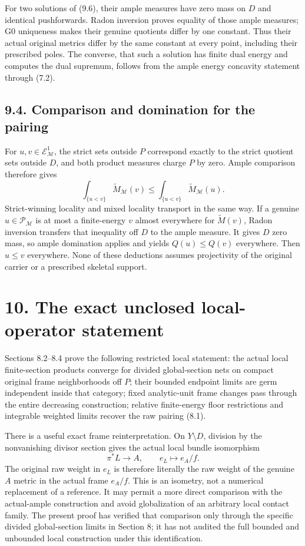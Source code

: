 \documentclass[
  10pt,
]{article}
\begin{document}
For two solutions of (9.6), their ample measures have zero mass on \(D\)
and identical pushforwards. Radon inversion proves equality of those
ample measures; G0 uniqueness makes their genuine quotients differ by
one constant. Thus their actual original metrics differ by the same
constant at every point, including their prescribed poles. The converse,
that such a solution has finite dual energy and computes the dual
supremum, follows from the ample energy concavity statement through
(7.2).

\subsection{9.4. Comparison and domination for the
pairing}\label{comparison-and-domination-for-the-pairing}

For \(u,v\in\mathcal E^1_{\mathcal M}\), the strict sets outside \(P\)
correspond exactly to the strict quotient sets outside \(D\), and both
product measures charge \(P\) by zero. Ample comparison therefore gives
\[\int_{\{u<v\}}\widetilde M_{\mathcal M}(v)
\leq\int_{\{u<v\}}\widetilde M_{\mathcal M}(u).            \tag{9.7}\]
Strict-winning locality and mixed locality transport in the same way. If
a genuine \(u\in\mathcal P_{\mathcal M}\) is at most a finite-energy
\(v\) almost everywhere for \(\widetilde M(v)\), Radon inversion
transfers that inequality off \(D\) to the ample measure. It gives \(D\)
zero mass, so ample domination applies and yields \(Q(u)\leq Q(v)\)
everywhere. Then \(u\leq v\) everywhere. None of these deductions
assumes projectivity of the original carrier or a prescribed skeletal
support.

\section{10. The exact unclosed local-operator
statement}\label{the-exact-unclosed-local-operator-statement}

Sections 8.2--8.4 prove the following restricted local statement: the
actual local finite-section products converge for divided global-section
nets on compact original frame neighborhoods off \(P\); their bounded
endpoint limits are germ independent inside that category; fixed
analytic-unit frame changes pass through the entire decreasing
construction; relative finite-energy floor restrictions and integrable
weighted limits recover the raw pairing (8.1).

There is a useful exact frame reinterpretation. On \(Y\setminus D\),
division by the nonvanishing divisor section gives the actual local
bundle isomorphism
\[\pi^*L\longrightarrow A,\qquad e_L\longmapsto e_A/f.\] The original
raw weight in \(e_L\) is therefore literally the raw weight of the
genuine \(A\) metric in the actual frame \(e_A/f\). This is an isometry,
not a numerical replacement of a reference. It may permit a more direct
comparison with the actual-ample construction and avoid globalization of
an arbitrary local contact family. The present proof has verified that
comparison only through the specific divided global-section limits in
Section 8; it has not audited the full bounded and unbounded local
construction under this identification.
\end{document}
